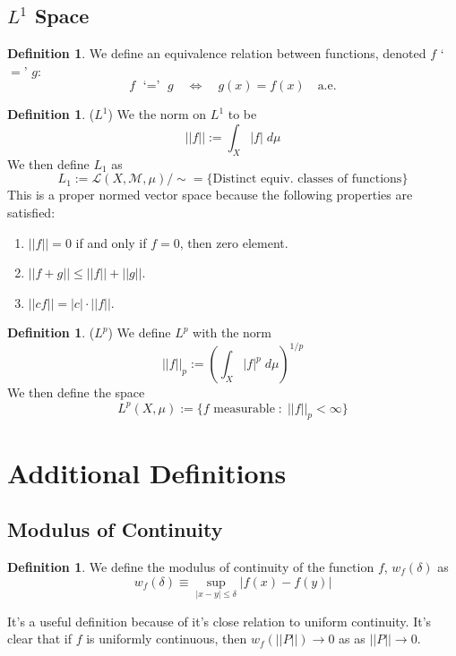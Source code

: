 \documentclass[12pt]{article}
\theoremstyle{plain}
\theoremstyle{definition}
\newtheorem{defn}[thm]{Definition}
\theoremstyle{remark}
\begin{document}
\subsection{$L^1$ Space}
\begin{defn}
We define an equivalence relation between functions, denoted $f$ `$=$' $g$:
\[
    f \text{ `$=$' } g
    \quad \Leftrightarrow\quad 
    g(x) = f(x) \quad \text{a.e.}
\]
\end{defn}

\begin{defn} ($L^1$) We the norm on $L^1$ to be
\[
    ||f||:= \int_X |f| \; d\mu
\]
We then define $L_1$ as
\[
    L_1 := \mathscr{L}(X,\mathscr{M},\mu) / \sim
    = \{\text{Distinct equiv. classes of functions}\}
\]
This is a proper normed vector space because the following properties are satisfied:
\begin{enumerate}
    \item $||f|| = 0$ if and only if $f=0$, then zero element.
    \item $||f+g||\leq ||f|| + ||g||$.
    \item $||c f|| = |c| \cdot ||f||$.
\end{enumerate}
\end{defn}

\begin{defn} ($L^p$) We define $L^p$ with the norm
\[
    ||f||_p:= \left(\int_X |f|^p \; d\mu\right)^{1/p}
\]
We then define the space
\[
    L^p(X,\mu) := \{\text{$f$ measurable}\;:\;
    \text{$||f||_p < \infty$}\}
\]
\end{defn}





\newpage
\appendix


\section{Additional Definitions}

\subsection{Modulus of Continuity}

\begin{defn} We define the modulus of continuity of the function $f$, $w_f(\delta)$ as 
\begin{equation}
    w_f(\delta) \equiv \sup_{|x-y|\leq\delta} |f(x)-f(y)|
\end{equation}
\end{defn}
It's a useful definition because of it's close relation to uniform continuity.
It's clear that if $f$ is uniformly continuous, then $w_f\left(||P||\right)\rightarrow0$ as as $||P||\rightarrow0$.
\end{document}
